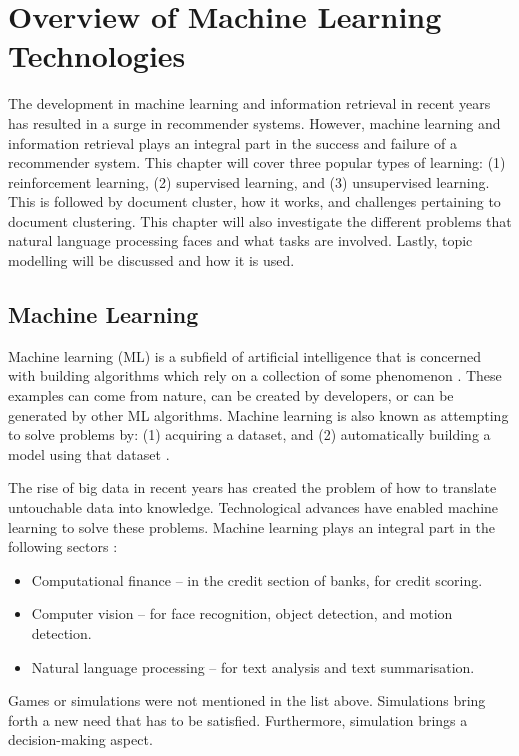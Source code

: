 \chapter{Overview of Machine Learning Technologies}
\label{chap: Chapter 3}
The development in machine learning and information retrieval in recent years has resulted in a surge in recommender systems. However, machine learning and information retrieval plays an integral part in the success and failure of a recommender system. This chapter  will cover three popular types of learning: (1) reinforcement learning, (2) supervised learning, and (3) unsupervised learning. This is followed by document cluster, how it works, and challenges pertaining to document clustering. This chapter will also investigate the different problems that natural language processing faces and what tasks are involved.
Lastly, topic modelling will be discussed and how it is used.

\section{Machine Learning} \label{ssec:MLoverview}


Machine learning (ML) is a subfield of artificial intelligence that is concerned with building algorithms which rely on a collection of some phenomenon \cite{Andriybook2019}. These examples can come from nature, can be created by developers, or can be generated by other ML algorithms. Machine learning is also known as attempting to solve problems by: (1) acquiring a dataset, and (2) automatically building a model using that dataset \cite{sebastiani2002machine}. 

The rise of big data in recent years has created the problem of how to translate untouchable data into knowledge. Technological advances have enabled machine learning to solve these problems. Machine learning plays an integral part in the following sectors \cite{alpaydin2009introduction}:

\begin{itemize}
  \item Computational finance – in the credit section of banks, for credit scoring.
  \item Computer vision – for face recognition, object detection, and motion detection.
  \item Natural language processing – for text analysis and text summarisation.
\end{itemize}

Games or simulations were not mentioned in the list above. Simulations bring forth a new need that has to be satisfied. Furthermore, simulation brings a decision-making aspect.

